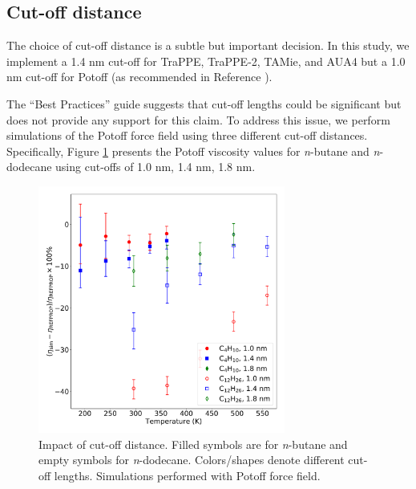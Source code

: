 \documentclass[preprint,review,12pt]{elsarticle}
\begin{document}
	
	\subsection{Cut-off distance}
	
	The choice of cut-off distance is a subtle but important decision. In this study, we implement a 1.4 nm cut-off for TraPPE, TraPPE-2, TAMie, and AUA4 but a 1.0 nm cut-off for Potoff (as recommended in Reference ).
	
	
	The ``Best Practices'' guide suggests that cut-off lengths could be significant but does not provide any support for this claim. To address this issue, we perform simulations of the Potoff force field using three different cut-off distances. Specifically, Figure \ref{fig:cutoff_distance} presents the Potoff viscosity values for \textit{n}-butane and \textit{n}-dodecane using cut-offs of 1.0 nm, 1.4 nm, 1.8 nm. 
	
	
	\begin{figure}[htb!]
		\centering
		\includegraphics[width=3.2in]{cutoff_distance.pdf}
		\caption{Impact of cut-off distance. Filled symbols are for \textit{n}-butane and empty symbols for \textit{n}-dodecane. Colors/shapes denote different cut-off lengths. Simulations performed with Potoff force field.}
		\label{fig:cutoff_distance}
	\end{figure} 
	
\end{document}
